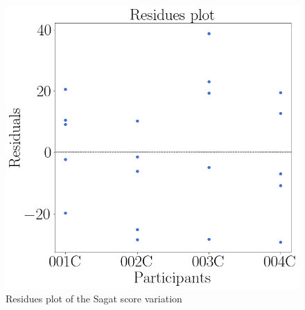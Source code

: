\begin{figure}[!htb]
\begin{minipage}{0.45\linewidth}
        \includegraphics[width = \linewidth]{Resultados/Sagat/Figuras/png/residplot_sagat_var.png}
        \caption{Residues plot of the Sagat score variation}
        \label{fig:residual_sagat_var}
    \end{minipage}
\end{figure}

\FloatBarrier